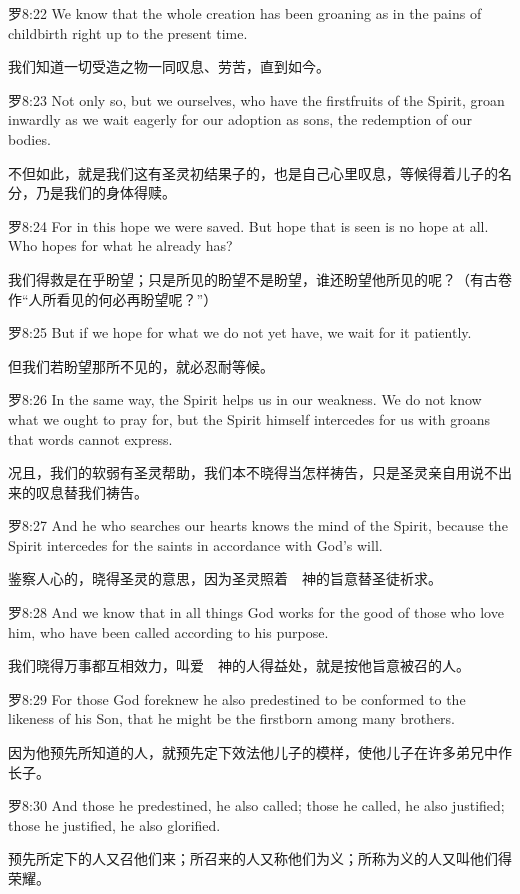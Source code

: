 \documentclass[a4paper,11pt,onecolumn,twoside]{ctexart}
\begin{document}
\begin{multicols}{2}
 罗8:22
 We know that the whole creation has been groaning as in the pains of childbirth right up to the present time.

 我们知道一切受造之物一同叹息、劳苦，直到如今。


 罗8:23
 Not only so, but we ourselves, who have the firstfruits of the Spirit, groan inwardly as we wait eagerly for our adoption as sons, the redemption of our bodies.

 不但如此，就是我们这有圣灵初结果子的，也是自己心里叹息，等候得着儿子的名分，乃是我们的身体得赎。


 罗8:24
 For in this hope we were saved. But hope that is seen is no hope at all. Who hopes for what he already has?

 我们得救是在乎盼望；只是所见的盼望不是盼望，谁还盼望他所见的呢？（有古卷作“人所看见的何必再盼望呢？”）


 罗8:25
 But if we hope for what we do not yet have, we wait for it patiently.

 但我们若盼望那所不见的，就必忍耐等候。


 罗8:26
 In the same way, the Spirit helps us in our weakness. We do not know what we ought to pray for, but the Spirit himself intercedes for us with groans that words cannot express.

 况且，我们的软弱有圣灵帮助，我们本不晓得当怎样祷告，只是圣灵亲自用说不出来的叹息替我们祷告。


 罗8:27
 And he who searches our hearts knows the mind of the Spirit, because the Spirit intercedes for the saints in accordance with God's will.

 鉴察人心的，晓得圣灵的意思，因为圣灵照着　神的旨意替圣徒祈求。


 罗8:28
 And we know that in all things God works for the good of those who love him, who have been called according to his purpose.

 我们晓得万事都互相效力，叫爱　神的人得益处，就是按他旨意被召的人。


 罗8:29
 For those God foreknew he also predestined to be conformed to the likeness of his Son, that he might be the firstborn among many brothers.

 因为他预先所知道的人，就预先定下效法他儿子的模样，使他儿子在许多弟兄中作长子。


 罗8:30
 And those he predestined, he also called; those he called, he also justified; those he justified, he also glorified.

 预先所定下的人又召他们来；所召来的人又称他们为义；所称为义的人又叫他们得荣耀。



\end{multicols}
\end{document}
